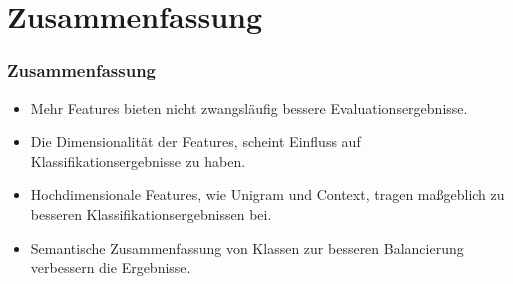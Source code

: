 \documentclass{beamer}
\begin{document}
\section{Zusammenfassung}
	\begin{frame}
		\frametitle{Zusammenfassung}
		\begin{itemize}
			\item Mehr Features bieten nicht zwangsläufig bessere Evaluationsergebnisse.
			\item Die Dimensionalität der Features, scheint Einfluss auf Klassifikationsergebnisse zu haben.
			\item Hochdimensionale Features, wie Unigram und Context, tragen maßgeblich zu besseren Klassifikationsergebnissen bei.
			\item Semantische Zusammenfassung von Klassen zur besseren Balancierung verbessern die Ergebnisse.
		\end{itemize}
	\end{frame}
\end{document}
